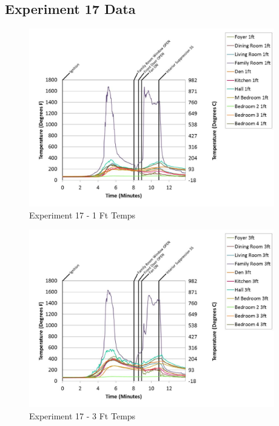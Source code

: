 \documentclass{article}
\begin{document}
\begin{appendices}
	\clearpage

		\clearpage
\clearpage		\large
\subsection{Experiment 17 Data} \label{App:Exp17Results} 

	\begin{figure}[h!]
		\centering
		\includegraphics[height=3.05in]{0_Images/Results_Charts/Exp_17_Charts/1FtTemps.pdf}
		\caption{Experiment 17 - 1 Ft Temps}
	\end{figure}
 

	\begin{figure}[h!]
		\centering
		\includegraphics[height=3.05in]{0_Images/Results_Charts/Exp_17_Charts/3FtTemps.pdf}
		\caption{Experiment 17 - 3 Ft Temps}
	\end{figure}
 
	\clearpage


\end{appendices}
\end{document}
